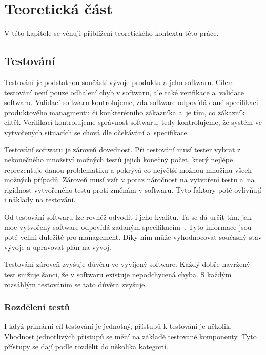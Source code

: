 \chapter{Teoretická část}\label{chap:teorie}

V této kapitole se věnuji přiblížení teoretického kontextu této práce.

\section{Testování}

Testování je podstatnou součástí vývoje produktu a jeho softwaru. Cílem testování není pouze odhalení chyb v softwaru, ale také verifikace a~validace softwaru. Validací softwaru kontrolujeme, zda software odpovídá dané specifikaci produktového managmentu či konkterétního zákazníka a~je tím, co zákazník chtěl. Verifikací kontrolujeme správnost softwaru, tedy kontrolujeme, že systém ve vytvořených situacích se chová dle očekávání a~specifikace. \cite{singh2012software}

Testování softwaru je zároveň dovednost. Při testování musí tester vybrat z nekonečného množství možných testů jejich konečný počet, který nejlépe reprezentuje danou problematiku a pokrývá co největší možnou množinu všech možných případů. Zároveň musí vzít v potaz náročnost na vytvoření testu a~na rigidnost vytvořeného testu proti změnám v softwaru. Tyto faktory poté ovlivňují i náklady na testování. \cite{fewster1999software}

Od testování softwaru lze rovněž odvodit i jeho kvalitu. Ta se dá určit tím, jak moc vytvořený software odpovídá zadaným specifikacím~\cite{software_quality}. Tyto informace jsou poté velmi důležité pro management. Díky nim může vyhodnocovat současný stav vývoje a upravovat plán na vývoj. 

Testování zároveň zvyšuje důvěru ve vyvíjený software. Každý dobře navržený test snižuje šanci, že v softwaru existuje nepodchycená chyba. S každým rozsáhlým testováním se tato důvěra zvyšuje. \cite{fewster1999software}

\subsection{Rozdělení testů}

I když primární cíl testování je jednotný, přístupů k testování je několik. Vhodnost jednotlivých přístupů se mění na základě testované komponenty. Tyto přístupy se dají podle \cite{luo2001software} rozdělit do několika kategorií.

